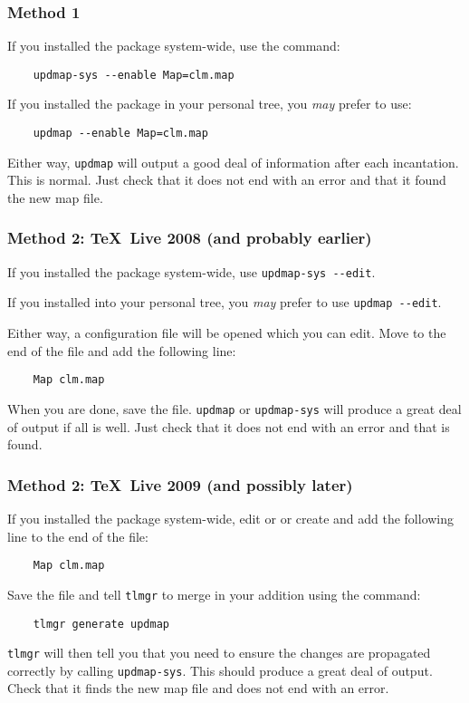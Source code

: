 \documentclass[11pt,british,a4paper]{article}
\begin{document}
\subsubsection{Method 1}

If you installed the package system-wide, use the command:
\begin{verbatim}
	updmap-sys --enable Map=clm.map
\end{verbatim}
If you installed the package in your personal tree, you \emph{may} prefer to use:
\begin{verbatim}
	updmap --enable Map=clm.map
\end{verbatim}

Either way, \verb|updmap| will output a good deal of information after each incantation. This is normal. Just check that it does not end with an error and that it found the new map file.

\subsubsection{Method 2: \TeX~Live 2008 (and probably earlier)}

If you installed the package system-wide, use \verb|updmap-sys --edit|.

If you installed into your personal tree, you \emph{may} prefer to use	\verb|updmap --edit|.

Either way, a configuration file will be opened which you can edit. Move to the end of the file and add the following line:
\begin{verbatim}
	Map clm.map
\end{verbatim}
When you are done, save the file. \verb|updmap| or \verb|updmap-sys| will produce a great deal of output if all is well. Just check that it does not end with an error and that  is found.

\subsubsection{Method 2: \TeX~Live 2009 (and possibly later)}

If you installed the package system-wide, edit or or create  and add the following line to the end of the file:
\begin{verbatim}
	Map clm.map
\end{verbatim}
Save the file and tell \verb|tlmgr| to merge in your addition using the command:
\begin{verbatim}
	tlmgr generate updmap
\end{verbatim}
\verb|tlmgr| will then tell you that you need to ensure the changes are propagated correctly by calling \verb|updmap-sys|. This should produce a great deal of output. Check that it finds the new map file and does not end with an error.
\end{document}

